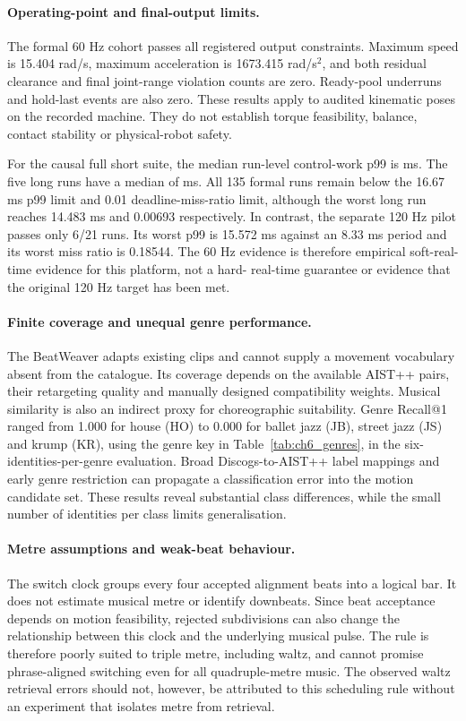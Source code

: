 \paragraph{Operating-point and final-output limits.}
The formal 60 Hz cohort passes all registered output constraints. Maximum speed
is 15.404 rad/s, maximum acceleration is 1673.415 rad/s$^2$, and both residual
clearance and final joint-range violation counts are zero. Ready-pool underruns
and hold-last events are also zero. These results apply to audited kinematic
poses on the recorded machine. They do not establish torque feasibility,
balance, contact stability or physical-robot safety.

For the causal full short suite, the median run-level control-work p99 is
\ChSixFullWork{} ms. The five long runs have a median of \ChSixLongWork{} ms.
All 135 formal runs
remain below the 16.67 ms p99 limit and 0.01 deadline-miss-ratio limit, although
the worst long run reaches 14.483 ms and 0.00693 respectively. In contrast, the
separate 120 Hz pilot passes only 6/21 runs. Its worst p99 is 15.572 ms against
an 8.33 ms period and its worst miss ratio is 0.18544. The 60 Hz evidence is
therefore empirical soft-real-time evidence for this platform, not a hard-
real-time guarantee or evidence that the original 120 Hz target has been met.

\paragraph{Finite coverage and unequal genre performance.}
The BeatWeaver adapts existing clips and cannot supply a movement vocabulary
absent from the catalogue. Its coverage depends on the available AIST++ pairs,
their retargeting quality and manually designed compatibility weights. Musical
similarity is also an indirect proxy for choreographic suitability. Genre
Recall@1 ranged from 1.000 for house (HO) to 0.000 for ballet jazz (JB), street jazz (JS) and
krump (KR), using the genre key in Table~\ref{tab:ch6_genres}, in the six-identities-per-genre evaluation. Broad Discogs-to-AIST++ label
mappings and early genre restriction can propagate a classification error into
the motion candidate set. These results reveal substantial class differences,
while the small number of identities per class limits generalisation.

\paragraph{Metre assumptions and weak-beat behaviour.}
The switch clock groups every four accepted alignment beats into a logical
bar. It does not estimate musical metre or identify downbeats. Since beat
acceptance depends on motion feasibility, rejected subdivisions can also change
the relationship between this clock and the underlying musical pulse. The rule
is therefore poorly suited to triple metre, including waltz, and cannot promise
phrase-aligned switching even for all quadruple-metre music. The observed waltz
retrieval errors should not, however, be attributed to this scheduling rule
without an experiment that isolates metre from retrieval.

